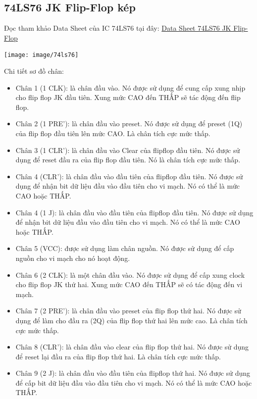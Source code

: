 \documentclass[10pt,a4paper]{report}
\begin{document}
\subsection{74LS76 JK Flip-Flop kép}
Đọc tham khảo Data Sheet của IC 74LS76 tại đây: \hyperref{https://pdf1.alldatasheet.com/datasheet-pdf/view/12663/ONSEMI/74LS76.html}{category}{name}{Data Sheet 74LS76 JK Flip-Flop} %
\begin{center}
	\texttt{[image: image/74ls76]}
\end{center}

Chi tiết sơ đồ chân: %
\begin{itemize}
	\item Chân 1 (1 CLK): là chân đầu vào. Nó được sử dụng để cung cấp xung nhịp cho flip flop JK đầu tiên. Xung mức CAO đến THẤP sẽ tác động đến flip flop.
	\item Chân 2 (1 PRE'): là chân đầu vào preset. Nó được sử dụng để preset (1Q) của flip flop đầu tiên lên mức CAO. Là chân tích cực mức thấp.
	\item Chân 3 (1 CLR'): là chân đầu vào Clear của flipflop đầu tiên. Nó được sử dụng để reset đầu ra của flip flop đầu tiên. Nó là chân tích cực mức thấp.
	\item Chân 4 (CLR'): là chân đầu vào đầu tiên của flipflop đầu tiên. Nó được sử dụng để nhận bit dữ liệu đầu vào đầu tiên cho vi mạch. Nó có thể là mức CAO hoặc THẤP.
	\item Chân 4 (1 J): là chân đầu vào đầu tiên của flipflop đầu tiên. Nó được sử dụng để nhận bit dữ liệu đầu vào đầu tiên cho vi mạch. Nó có thể là mức CAO hoặc THẤP.
	\item Chân 5 (VCC): được sử dụng làm chân nguồn. Nó được sử dụng để cấp nguồn cho vi mạch cho nó hoạt động.
	\item Chân 6 (2 CLK): là một chân đầu vào. Nó được sử dụng để cấp xung clock cho flip flop JK thứ hai. Xung mức CAO đến THẤP sẽ có tác động đến vi mạch.
	\item Chân 7 (2 PRE'): là chân đầu vào preset của flip flop thứ hai. Nó được sử dụng để làm cho đầu ra (2Q) của flip flop thứ hai lên mức cao. Là chân tích cực mức thấp.
	\item Chân 8 (CLR'): là chân đầu vào clear của flip flop thứ hai. Nó được sử dụng để reset lại đầu ra của flip flop thứ hai. Là chân tích cực mức thấp.
	\item Chân 9 (2 J): là chân đầu vào đầu tiên của flipflop thứ hai. Nó được sử dụng để cấp bit dữ liệu đầu vào đầu tiên cho vi mạch. Nó có thể là mức CAO hoặc THẤP.

\end{itemize}
\end{document}
